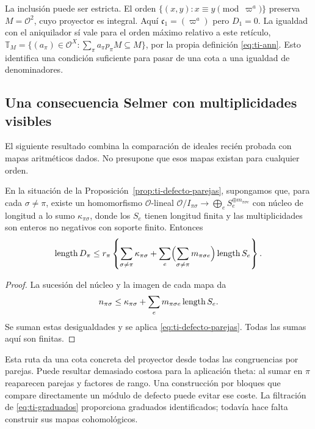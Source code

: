 La inclusión puede ser estricta. El orden
$\{(x,y):x\equiv y\pmod{\varpi^a}\}$ preserva
$M=\mathcal O^2$, cuyo proyector es integral. Aquí
$\mathfrak c_1=(\varpi^a)$ pero $D_1=0$.
La igualdad con el aniquilador sí vale para el orden máximo
relativo a este retículo,
$\mathbb T_M=\{(a_\pi)\in\mathcal O^X:
\sum_\pi a_\pi p_\pi M\subseteq M\}$,
por la propia definición \eqref{eq:ti-ann}.
Esto identifica una condición suficiente para pasar de una cota
a una igualdad de denominadores.

\subsection{Una consecuencia Selmer con multiplicidades visibles}

El siguiente resultado combina la comparación de ideales recién
probada con mapas aritméticos dados. No presupone que esos mapas
existan para cualquier orden.

\begin{teorema}
\label{thm:ti-parejas-selmer}
En la situación de la Proposición~\ref{prop:ti-defecto-parejas},
supongamos que, para cada $\sigma\ne\pi$, existe un homomorfismo $\mathcal O$-lineal
$\mathcal O/I_{\pi\sigma}\to\bigoplus_e S_e^{\oplus m_{\pi\sigma e}}$
con núcleo de longitud a lo sumo $\kappa_{\pi\sigma}$,
donde los $S_e$ tienen longitud finita y las multiplicidades son
enteros no negativos con soporte finito. Entonces
\begin{equation}
 \operatorname{length} D_\pi\le
 r_\pi\left\{\sum_{\sigma\ne\pi}\kappa_{\pi\sigma}
       +\sum_e\Bigl(\sum_{\sigma\ne\pi}m_{\pi\sigma e}\Bigr)
                       \operatorname{length} S_e\right\}.
 \label{eq:ti-parejas-selmer}
\end{equation}
\end{teorema}
\begin{proof}
La sucesión del núcleo y la imagen de cada mapa da
\[
 n_{\pi\sigma}\le\kappa_{\pi\sigma}+
 \sum_e m_{\pi\sigma e}\operatorname{length} S_e.
\]
Se suman estas desigualdades y se aplica
\eqref{eq:ti-defecto-parejas}. Todas las sumas aquí son finitas.
\end{proof}

Esta ruta da una cota concreta del proyector desde todas las
congruencias por parejas. Puede resultar demasiado costosa para
la aplicación theta: al sumar en $\pi$ reaparecen parejas y factores
de rango. Una construcción por bloques que compare directamente
un módulo de defecto puede evitar ese coste. La filtración de
\eqref{eq:ti-graduados} proporciona graduados identificados;
todavía hace falta construir sus mapas cohomológicos.

